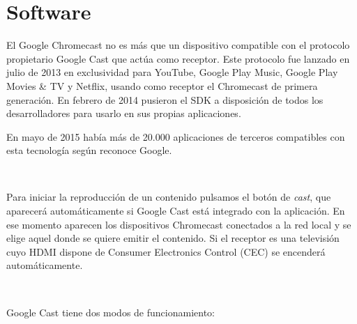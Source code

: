 \section{Software}

El Google Chromecast no es más que un dispositivo compatible con el protocolo propietario Google Cast que actúa como receptor.
Este protocolo fue lanzado en julio de 2013 en exclusividad para YouTube, Google Play Music, Google Play Movies \& TV y Netflix, usando como receptor el Chromecast de primera generación. En febrero de 2014 pusieron el SDK a disposición de todos los desarrolladores para usarlo en sus propias aplicaciones.

En mayo de 2015 había más de 20.000 aplicaciones de terceros compatibles con esta tecnología según reconoce Google.

\

Para iniciar la reproducción de un contenido pulsamos el botón de \textit{cast}, que aparecerá automáticamente si Google Cast está integrado con la aplicación.
En ese momento aparecen los dispositivos Chromecast conectados a la red local y se elige aquel donde se quiere emitir el contenido.
Si el receptor es una televisión cuyo HDMI dispone de Consumer Electronics Control (CEC) se encenderá automáticamente.

\

Google Cast tiene dos modos de funcionamiento:

